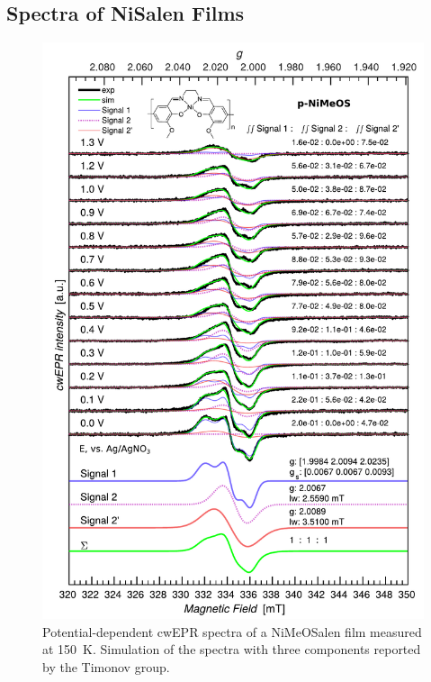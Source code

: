 \subsection{Spectra of NiSalen Films}
\begin{figure}[h]
\center
	\includegraphics[width=1\textwidth]{./operando_epr/figures/CRYO/Figure_S8.pdf}
	\caption{Potential-dependent cwEPR spectra of a NiMeOSalen film measured at 150~K. Simulation of the spectra with three components reported by the Timonov group.}
	\label{fig:cwEPR_CRYO_NiSalen_REDOX_SIM}
\end{figure}



